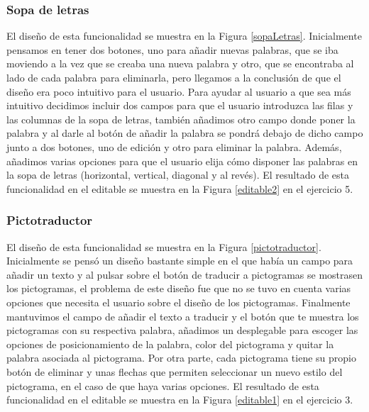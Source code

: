 \subsubsection{Sopa de letras}
El diseño de esta funcionalidad se muestra en la Figura \ref{sopaLetras}. Inicialmente pensamos en tener dos botones, uno para añadir nuevas palabras, que se iba moviendo a la vez que se creaba una nueva palabra y otro, que se encontraba al lado de cada palabra para eliminarla, pero llegamos a la conclusión de que el diseño era poco intuitivo para el usuario. Para ayudar al usuario a que sea más intuitivo decidimos incluir dos campos para que el usuario introduzca las filas y las columnas de la sopa de letras, también añadimos otro campo donde poner la palabra y al darle al botón de añadir la palabra se pondrá debajo de dicho campo junto a dos botones, uno de edición y otro para eliminar la palabra. Además, añadimos varias opciones para que el usuario elija cómo disponer las palabras en la sopa de letras (horizontal, vertical, diagonal y al revés). El resultado de esta funcionalidad en el editable se muestra en la Figura \ref{editable2} en el ejercicio 5.

\subsubsection{Pictotraductor}
El diseño de esta funcionalidad se muestra en la Figura \ref{pictotraductor}. Inicialmente se pensó un diseño bastante simple en el que había un campo para añadir un texto y al pulsar sobre el botón de traducir a pictogramas se mostrasen los pictogramas, el problema de este diseño fue que no se tuvo en cuenta varias opciones que necesita el usuario sobre el diseño de los pictogramas. Finalmente mantuvimos el campo de añadir el texto a traducir y el botón que te muestra los pictogramas con su respectiva palabra, añadimos un desplegable para escoger las opciones de posicionamiento de la palabra, color del pictograma y quitar la palabra asociada al pictograma. Por otra parte, cada pictograma tiene su propio botón de eliminar y unas flechas que permiten seleccionar un nuevo estilo del pictograma, en el caso de que haya varias opciones. El resultado de esta funcionalidad en el editable se muestra en la Figura \ref{editable1} en el ejercicio 3.

